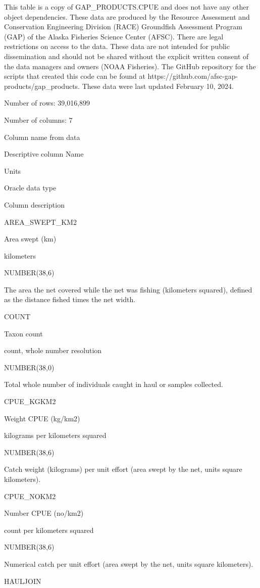 \documentclass[
  letterpaper,
  oneside,
  open=any]{scrbook}
\begin{document}
This table is a copy of GAP\_PRODUCTS.CPUE and does not have any other
object dependencies. These data are produced by the Resource Assessment
and Conservation Engineering Division (RACE) Groundfish Assessment
Program (GAP) of the Alaska Fisheries Science Center (AFSC). There are
legal restrictions on access to the data. These data are not intended
for public dissemination and should not be shared without the explicit
written consent of the data managers and owners (NOAA Fisheries). The
GitHub repository for the scripts that created this code can be found at
https://github.com/afsc-gap-products/gap\_products. These data were last
updated February 10, 2024.

Number of rows: 39,016,899

Number of columns: 7

Column name from data

Descriptive column Name

Units

Oracle data type

Column description

AREA\_SWEPT\_KM2

Area swept (km)

kilometers

NUMBER(38,6)

The area the net covered while the net was fishing (kilometers squared),
defined as the distance fished times the net width.

COUNT

Taxon count

count, whole number resolution

NUMBER(38,0)

Total whole number of individuals caught in haul or samples collected.

CPUE\_KGKM2

Weight CPUE (kg/km2)

kilograms per kilometers squared

NUMBER(38,6)

Catch weight (kilograms) per unit effort (area swept by the net, units
square kilometers).

CPUE\_NOKM2

Number CPUE (no/km2)

count per kilometers squared

NUMBER(38,6)

Numerical catch per unit effort (area swept by the net, units square
kilometers).

HAULJOIN
\end{document}
